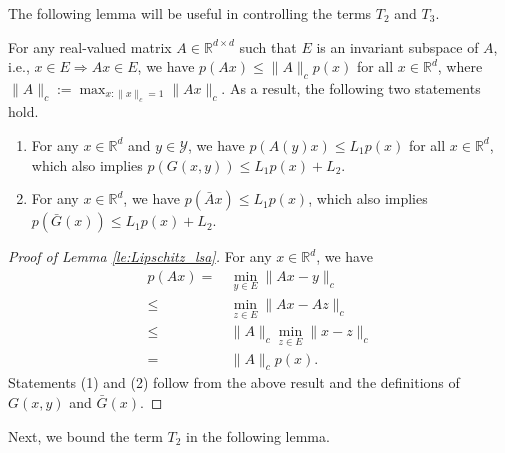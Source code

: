 \documentclass[11 pt]{article}
\begin{document}
	
	The following lemma will be useful in controlling the terms $T_2$ and $T_3$.
	\begin{lemma}\label{le:Lipschitz_lsa}
		For any real-valued matrix $A\in\mathbb{R}^{d\times d}$ such that $E$ is an invariant subspace of $A$, i.e., $x\in E \Rightarrow Ax\in E$, we have $p(Ax)\leq \|A\|_cp(x)$ for all $x\in\mathbb{R}^d$, where $\|A\|_c:=\max_{x:\|x\|_c=1}\|Ax\|_c$. As a result, the following two statements hold.
		\begin{enumerate}[(1)] 
			\item For any $x\in\mathbb{R}^d$ and $y\in\mathcal{Y}$, we have $p(A(y)x)\leq L_1p(x)$ for all $x\in\mathbb{R}^d$, which also implies $p(G(x,y))\leq L_1p(x)+L_2$.
			\item For any $x\in\mathbb{R}^d$, we have $p(\bar{A}x)\leq L_1p(x)$, which also implies $p(\bar{G}(x))\leq L_1p(x)+L_2$.
		\end{enumerate}
	\end{lemma}
	\begin{proof}[Proof of Lemma \ref{le:Lipschitz_lsa}]
		For any $x\in\mathbb{R}^d$, we have
		\begin{align*}
			p(Ax)=\,&\min_{y\in E}\|Ax-y\|_c\\
			\leq \,&\min_{z\in E}\|Ax-Az\|_c\tag{This follows from $z\in E\Rightarrow Az\in E$}\\
			\leq \,&\|A\|_c\min_{z\in E}\|x-z\|_c\\
			=\,&\|A\|_cp(x).
		\end{align*}
		Statements (1) and (2) follow from the above result and the definitions of $G(x,y)$ and $\bar{G}(x)$.
	\end{proof}
	
	
	Next, we bound the term $T_2$ in the following lemma.
	
\end{document}
